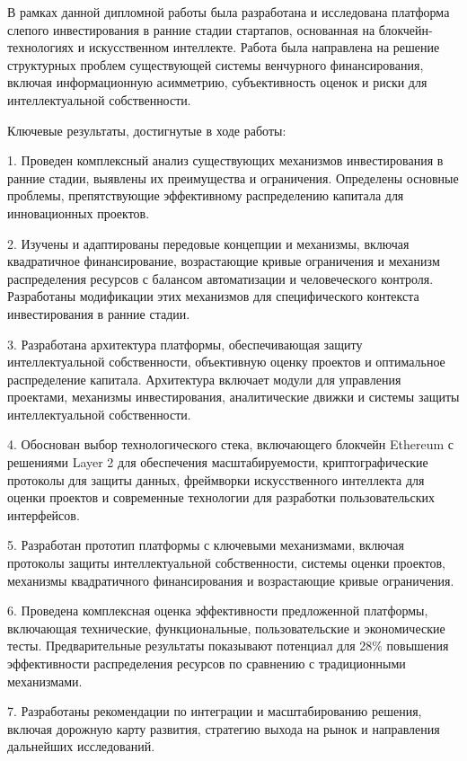 \documentclass[
    14pt,
    specialist,
    candidate, %
    subf, %
    href,
    dotsinheaders=false
]{disser}
\begin{document}
В рамках данной дипломной работы была разработана и исследована платформа слепого инвестирования в ранние стадии стартапов, основанная на блокчейн-технологиях и искусственном интеллекте. Работа была направлена на решение структурных проблем существующей системы венчурного финансирования, включая информационную асимметрию, субъективность оценок и риски для интеллектуальной собственности.

Ключевые результаты, достигнутые в ходе работы:

1. Проведен комплексный анализ существующих механизмов инвестирования в ранние стадии, выявлены их преимущества и ограничения. Определены основные проблемы, препятствующие эффективному распределению капитала для инновационных проектов.

2. Изучены и адаптированы передовые концепции и механизмы, включая квадратичное финансирование, возрастающие кривые ограничения и механизм распределения ресурсов с балансом автоматизации и человеческого контроля. Разработаны модификации этих механизмов для специфического контекста инвестирования в ранние стадии.

3. Разработана архитектура платформы, обеспечивающая защиту интеллектуальной собственности, объективную оценку проектов и оптимальное распределение капитала. Архитектура включает модули для управления проектами, механизмы инвестирования, аналитические движки и системы защиты интеллектуальной собственности.

4. Обоснован выбор технологического стека, включающего блокчейн Ethereum с решениями Layer 2 для обеспечения масштабируемости, криптографические протоколы для защиты данных, фреймворки искусственного интеллекта для оценки проектов и современные технологии для разработки пользовательских интерфейсов.

5. Разработан прототип платформы с ключевыми механизмами, включая протоколы защиты интеллектуальной собственности, системы оценки проектов, механизмы квадратичного финансирования и возрастающие кривые ограничения.

6. Проведена комплексная оценка эффективности предложенной платформы, включающая технические, функциональные, пользовательские и экономические тесты. Предварительные результаты показывают потенциал для 28\% повышения эффективности распределения ресурсов по сравнению с традиционными механизмами.

7. Разработаны рекомендации по интеграции и масштабированию решения, включая дорожную карту развития, стратегию выхода на рынок и направления дальнейших исследований.
\end{document}
